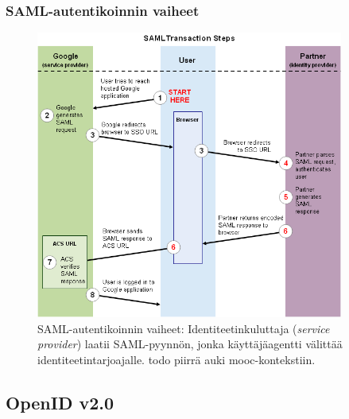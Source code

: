 \documentclass[finnish,gradu]{tktltiki}
\begin{document}


  \subsubsection{SAML-autentikoinnin vaiheet} %
  \label{ssub:saml_autentikoinnin_vaiheet}

    \begin{figure}
      \centering
      \includegraphics[width=0.9\textwidth]{images/google_saml_workflow_vertical.png}
      \caption{SAML-autentikoinnin vaiheet: Identiteetinkuluttaja (\emph{service provider}) laatii SAML-pyynnön, jonka käyttäjäagentti välittää identiteetintarjoajalle. todo piirrä auki mooc-kontekstiin.}
      \label{fig:saml_auth_vaiheet}
    \end{figure}





  \subsection{OpenID v2.0} %
  \label{sub:openid}
\end{document}
